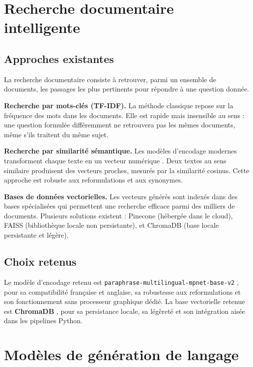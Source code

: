 \section{Recherche documentaire intelligente}

\subsection{Approches existantes}

La recherche documentaire consiste à retrouver, parmi un ensemble de documents,
les passages les plus pertinents pour répondre à une question donnée.

\textbf{Recherche par mots-clés (TF-IDF).}
La méthode classique repose sur la fréquence des mots dans les documents.
Elle est rapide mais insensible au sens : une question formulée différemment
ne retrouvera pas les mêmes documents, même s'ils traitent du même sujet.

\textbf{Recherche par similarité sémantique.}
Les modèles d'encodage modernes transforment chaque texte
en un vecteur numérique \cite{sbert}.
Deux textes au sens similaire produisent des vecteurs proches,
mesurés par la similarité cosinus.
Cette approche est robuste aux reformulations et aux synonymes.

\textbf{Bases de données vectorielles.}
Les vecteurs générés sont indexés dans des bases spécialisées
qui permettent une recherche efficace parmi des milliers de documents.
Plusieurs solutions existent : Pinecone (hébergée dans le cloud),
FAISS (bibliothèque locale non persistante),
et ChromaDB (base locale persistante et légère).

\subsection{Choix retenus}

Le modèle d'encodage retenu est \texttt{paraphrase-multilingual-mpnet-base-v2} \cite{sbert},
pour sa compatibilité française et anglaise, sa robustesse aux reformulations
et son fonctionnement sans processeur graphique dédié.
La base vectorielle retenue est \textbf{ChromaDB} \cite{chromadb},
pour sa persistance locale, sa légèreté et son intégration aisée dans les pipelines Python.

\section{Modèles de génération de langage}

